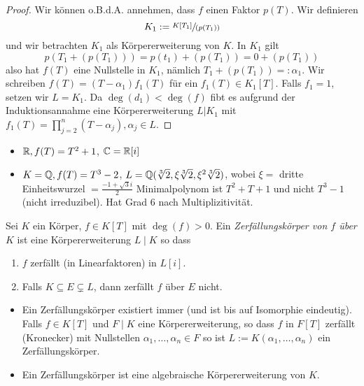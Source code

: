 \begin{proof}
	Wir können o.B.d.A. annehmen, dass $f$ %
	einen Faktor $p(T)$. Wir definieren
	\[
		K_1 := \sfrac{K[T_1]}{(p(T_1))}
	\]
	und wir betrachten $K_1$ als Körpererweiterung von $K$. In $K_1$ gilt
	\[
		p(T_1 + (p(T_1))) = p(t_1) + (p(T_1)) = 0 + (p(T_1))
	\] 
	also hat $f(T)$ eine Nullstelle in $K_1$, nämlich $T_1 + (p(T_1)) =: \alpha_1$.
	Wir schreiben $f(T) = (T-\alpha_1) f_1(T)$ für ein $f_1(T) \in K_1[T]$.
	Falls $f_1 = 1$, setzen wir $L = K_1$. Da $\deg(d_1) < \deg(f)$ fibt es aufgrund der Induktionsannahme eine Körpererweiterung $L | K_1$ mit
	$f_1(T) = \prod_{j=2}^{n} (T-\alpha_{j}), \alpha_{j} \in L$.
\end{proof}

\begin{eg}
	\begin{itemize}
		\item $\mathbb{R}, f(T) = T^2+1$, $\mathbb{C} = \mathbb{R}[i]$
		\item $K = \mathbb{Q}, f(T) = T^3 -2$, $L = \mathbb{Q}(\sqrt[3]{2}, \xi \sqrt[3]{2}, \xi^2 \sqrt[3]{2})$, wobei $\xi = $ dritte Einheitswurzel  $= \frac{-1+\sqrt{3} i}{2}$
			Minimalpolynom ist $T^2 + T + 1$ und nicht $T^3 -1$ (nicht irreduzibel).
			Hat Grad $6$ nach Multiplizitivität.
	\end{itemize}
\end{eg}

\begin{definition}
	Sei $K$ ein Körper, $f \in K[T]$ mit $\deg(f) > 0$.
	Ein \emph{Zerfällungskörper von $f$ über $K$ } ist eine Körpererweiterung $L \mid K$ so dass
	\begin{enumerate}[1)]
		\item $f$ zerfällt (in Linearfaktoren) in $L[i]$.
		\item Falls $K \subseteq E \subsetneq L$, dann zerfällt $f$ über $E$ nicht.
	\end{enumerate}
\end{definition}

\begin{remark}
	\begin{itemize}
		\item Ein Zerfällungskörper existiert immer (und ist bis auf Isomorphie eindeutig).
			Falls $f \in K[T]$ und $F \mid K$ eine Körpererweiterung, so dass $f$ in $F[T]$ zerfällt (Kronecker)
			mit Nullstellen $\alpha_1,\ldots,\alpha_{n} \in F$ so ist $L := K(\alpha_1,\ldots,\alpha_{n})$ ein Zerfällungskörper.
		\item Ein Zerfällungskörper ist eine algebraische Körpererweiterung von $K$.
	\end{itemize}
\end{remark}

